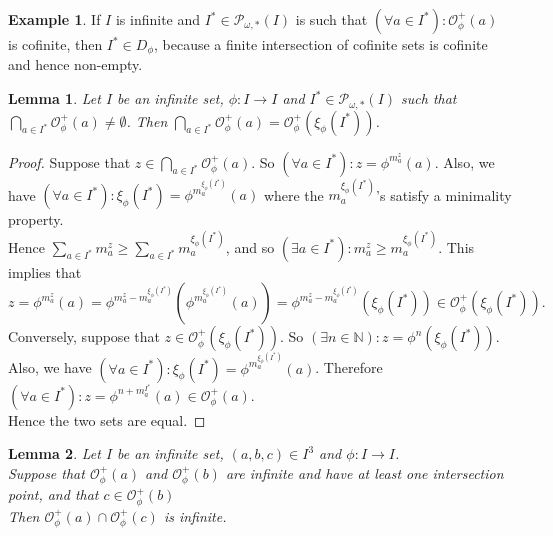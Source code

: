 \documentclass[a4paper,11pt]{article}
\theoremstyle{plain}
\newtheorem{lemma}{Lemma}[section]
\theoremstyle{definition}
\newtheorem{example}{Example}[section]   %
\theoremstyle{remark}
\begin{document}
\begin{example}
If $I$ is infinite and $I^* \in \mathcal{P}_{\omega,*}(I)$ is such that $(\forall a \in I^*) : \mathcal{O}^{+}_\phi(a)$ is cofinite, then $I^* \in D_\phi$, because a finite intersection of cofinite sets is cofinite and hence non-empty.
\end{example}

\begin{lemma}
\label{lemmaIntersOrb}
Let $I$ be an infinite set, $\phi : I \to I$ and $I^* \in \mathcal{P}_{\omega,*}(I)$ such that ${\bigcap_{a \in I^*} \mathcal{O}^{+}_\phi(a) \neq \emptyset}$. Then $\bigcap_{a \in I^*} \mathcal{O}^{+}_\phi(a) = \mathcal{O}^{+}_\phi(\xi_\phi(I^*))$.
\end{lemma}

\begin{proof}
Suppose that $z \in \bigcap_{a \in I^*} \mathcal{O}^{+}_\phi(a)$. So $(\forall a \in I^*) : z = \phi^{m^z_a}(a)$. Also, we have $(\forall a \in I^*) : \xi_\phi(I^*) = \phi^{m^{\xi_\phi(I^*)}_a}(a)$ where the $m^{\xi_\phi(I^*)}_a$'s satisfy a minimality property. \\
Hence $\sum_{a \in I^*} m^{z}_a \geq \sum_{a \in I^*} m^{\xi_\phi(I^*)}_a$, and so $(\exists a \in I^*) : m^{z}_a \geq m^{\xi_\phi(I^*)}_a$. This implies that 
\[ z = \phi^{m^z_a}(a) = \phi^{m^z_a - m^{\xi_\phi(I^*)}_a}(\phi^{m^{\xi_\phi(I^*)}_a}(a)) = \phi^{m^z_a - m^{\xi_\phi(I^*)}_a}(\xi_\phi(I^*)) \in \mathcal{O}^{+}_\phi(\xi_\phi(I^*)). \] 
Conversely, suppose that $z \in \mathcal{O}^{+}_\phi(\xi_\phi(I^*))$. So $(\exists n \in \mathbb{N}) : z = \phi^n(\xi_\phi(I^*))$. Also, we have $(\forall a \in I^*) : \xi_\phi(I^*) = \phi^{m^{\xi_\phi(I^*)}_a}(a)$. Therefore $(\forall a \in I^*) : z = \phi^{n+m^{I^*}_a}(a) \in \mathcal{O}^{+}_\phi(a)$. \\
Hence the two sets are equal.
\end{proof}

\begin{lemma}
\label{lemmaNonEmptyIntersectionOfTwoInfOrbIsInfinite}
Let $I$ be an infinite set, $(a,b,c) \in I^3$ and $\phi : I \to I$. \\
Suppose that $\mathcal{O}^{+}_\phi(a)$ and $\mathcal{O}^{+}_\phi(b)$ are infinite and have at least one intersection point, and that $c \in \mathcal{O}^{+}_\phi(b)$  \\
Then $\mathcal{O}^{+}_\phi(a) \cap \mathcal{O}^{+}_\phi(c)$ is infinite.
\end{lemma}
\end{document}
